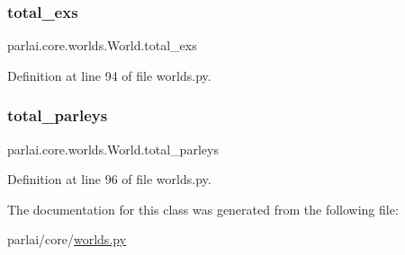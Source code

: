 \subsubsection{\texorpdfstring{total\+\_\+exs}{total\_exs}}
{\footnotesize\ttfamily parlai.\+core.\+worlds.\+World.\+total\+\_\+exs}



Definition at line 94 of file worlds.\+py.

\mbox{\label{classparlai_1_1core_1_1worlds_1_1World_ac23951eebe5c495ab2c79e57c960d681}} 
\subsubsection{\texorpdfstring{total\+\_\+parleys}{total\_parleys}}
{\footnotesize\ttfamily parlai.\+core.\+worlds.\+World.\+total\+\_\+parleys}



Definition at line 96 of file worlds.\+py.



The documentation for this class was generated from the following file\+:\begin{DoxyCompactItemize}
\item 
parlai/core/\hyperlink{parlai_2core_2worlds_8py}{worlds.\+py}\end{DoxyCompactItemize}
